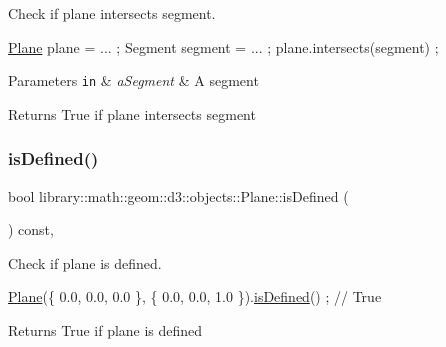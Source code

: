 Check if plane intersects segment. 


\begin{DoxyCode}
\hyperlink{classlibrary_1_1math_1_1geom_1_1d3_1_1objects_1_1_plane_a81fe78a983e2cb6ee6ad9bfabd22c3a4}{Plane} plane = ... ;
Segment segment = ... ;
plane.intersects(segment) ;
\end{DoxyCode}



\begin{DoxyParams}[1]{Parameters}
\mbox{\tt in}  & {\em a\+Segment} & A segment \\
\hline
\end{DoxyParams}
\begin{DoxyReturn}{Returns}
True if plane intersects segment 
\end{DoxyReturn}
\mbox{\label{classlibrary_1_1math_1_1geom_1_1d3_1_1objects_1_1_plane_aafbc8274c270be143b2fa3dc46459f17}} 
\subsubsection{\texorpdfstring{is\+Defined()}{isDefined()}}
{\footnotesize\ttfamily bool library\+::math\+::geom\+::d3\+::objects\+::\+Plane\+::is\+Defined (\begin{DoxyParamCaption}{ }\end{DoxyParamCaption}) const\hspace{0.3cm}{\ttfamily [override]}, {\ttfamily [virtual]}}



Check if plane is defined. 


\begin{DoxyCode}
\hyperlink{classlibrary_1_1math_1_1geom_1_1d3_1_1objects_1_1_plane_a81fe78a983e2cb6ee6ad9bfabd22c3a4}{Plane}(\{ 0.0, 0.0, 0.0 \}, \{ 0.0, 0.0, 1.0 \}).\hyperlink{classlibrary_1_1math_1_1geom_1_1d3_1_1objects_1_1_plane_aafbc8274c270be143b2fa3dc46459f17}{isDefined}() ; \textcolor{comment}{// True}
\end{DoxyCode}


\begin{DoxyReturn}{Returns}
True if plane is defined 
\end{DoxyReturn}


